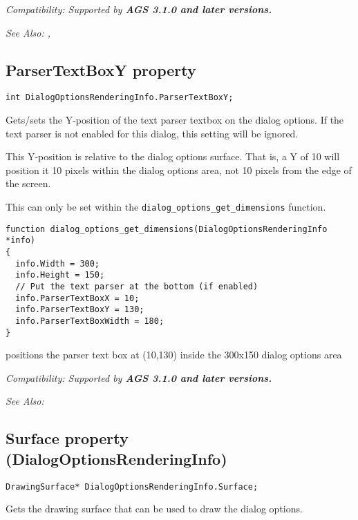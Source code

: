 \it{Compatibility:} Supported by \bf{AGS 3.1.0} and later versions.

\it{See Also:} ,


\subsection{ParserTextBoxY property}\label{DialogOptionsRenderingInfo.ParserTextBoxY}%

\begin{verbatim}
int DialogOptionsRenderingInfo.ParserTextBoxY;
\end{verbatim}
Gets/sets the Y-position of the text parser textbox on the dialog options.
If the text parser is not enabled for this dialog, this setting will be ignored.

This Y-position is relative to the dialog options surface. That is, a Y of 10
will position it 10 pixels within the dialog options area, not 10 pixels from
the edge of the screen.

This can only be set within the \verb$dialog_options_get_dimensions$ function.

\begin{verbatim}
function dialog_options_get_dimensions(DialogOptionsRenderingInfo *info)
{
  info.Width = 300;
  info.Height = 150;
  // Put the text parser at the bottom (if enabled)
  info.ParserTextBoxX = 10;
  info.ParserTextBoxY = 130;
  info.ParserTextBoxWidth = 180;
}
\end{verbatim}
positions the parser text box at (10,130) inside the 300x150 dialog options area

\it{Compatibility:} Supported by \bf{AGS 3.1.0} and later versions.

\it{See Also:} 


\subsection{Surface property (DialogOptionsRenderingInfo)}\label{DialogOptionsRenderingInfo.Surface}%

\begin{verbatim}
DrawingSurface* DialogOptionsRenderingInfo.Surface;
\end{verbatim}
Gets the drawing surface that can be used to draw the dialog options.

